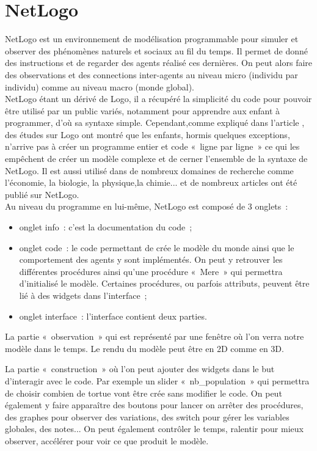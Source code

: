 \section{NetLogo}
\label{NetLogo}

NetLogo est un environnement de modélisation programmable pour simuler et observer des phénomènes naturels et sociaux au fil du temps. Il permet de donné des instructions et de regarder des agents réalisé ces dernières. On peut alors faire des observations et des connections inter-agents au niveau micro (individu par individu) comme au niveau macro (monde global).\\
NetLogo étant un dérivé de Logo, il a récupéré la simplicité du code pour pouvoir être utilisé par un public variés, notamment pour apprendre aux enfant à programmer, d'où sa syntaxe simple. Cependant,comme expliqué dans l'article \cite{netLogo}, des études sur Logo ont montré que les enfants, hormis quelques exceptions, n'arrive pas à créer un programme entier et code «~ligne par ligne~» ce qui les empêchent de créer un modèle complexe et de cerner l'ensemble de la syntaxe de NetLogo.
Il est aussi utilisé dans de nombreux domaines de recherche comme l'économie, la biologie, la physique,la chimie... et de nombreux articles ont été publié sur NetLogo.
\\

Au niveau du programme en lui-même, NetLogo est composé de 3 onglets~: 
\begin{itemize}
	\item onglet info~: c'est la documentation du code~;
	\item onglet code~: le code permettant de crée le modèle du monde ainsi que le comportement des agents y sont implémentés. On peut y retrouver les différentes procédures ainsi qu'une procédure «~Mere~» qui permettra d'initialisé le modèle. Certaines procédures, ou parfois attributs, peuvent être lié à des widgets dans l'interface~;
	\item onglet interface~: l'interface contient deux parties.
\end{itemize}


La partie «~observation~» qui est représenté par une fenêtre où l'on verra notre modèle dans le temps. Le rendu du modèle peut être en 2D comme en 3D.

La partie «~construction~» où l'on peut ajouter des widgets dans le but d’interagir avec le code. Par exemple un slider «~nb\_population~» qui permettra de choisir combien de tortue vont être crée sans modifier le code. On peut également y faire apparaître des boutons pour lancer on arrêter des procédures, des graphes pour observer des variations, des switch pour gérer les variables globales, des notes... On peut également contrôler le temps, ralentir pour mieux observer, accélérer pour voir ce que produit le modèle.
\\

